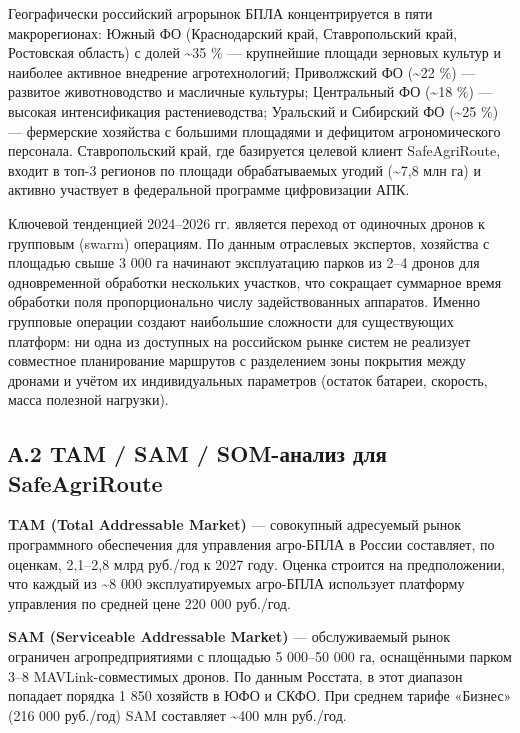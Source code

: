 \documentclass[14pt,a4paper]{extarticle}
\begin{document}
Географически российский агрорынок БПЛА концентрируется в пяти макрорегионах: Южный ФО (Краснодарский край, Ставропольский край, Ростовская область) с долей \textasciitilde35 \% --- крупнейшие площади зерновых культур и наиболее активное внедрение агротехнологий; Приволжский ФО (\textasciitilde22 \%) --- развитое животноводство и масличные культуры; Центральный ФО (\textasciitilde18 \%) --- высокая интенсификация растениеводства; Уральский и Сибирский ФО (\textasciitilde25 \%) --- фермерские хозяйства с большими площадями и дефицитом агрономического персонала. Ставропольский край, где базируется целевой клиент SafeAgriRoute, входит в топ-3 регионов по площади обрабатываемых угодий (\textasciitilde7,8 млн га) и активно участвует в федеральной программе цифровизации АПК.

Ключевой тенденцией 2024--2026 гг. является переход от одиночных дронов к групповым (swarm) операциям. По данным отраслевых экспертов, хозяйства с площадью свыше 3 000 га начинают эксплуатацию парков из 2--4 дронов для одновременной обработки нескольких участков, что сокращает суммарное время обработки поля пропорционально числу задействованных аппаратов. Именно групповые операции создают наибольшие сложности для существующих платформ: ни одна из доступных на российском рынке систем не реализует совместное планирование маршрутов с разделением зоны покрытия между дронами и учётом их индивидуальных параметров (остаток батареи, скорость, масса полезной нагрузки).

\hypertarget{ux430.2-tam-sam-som-ux430ux43dux430ux43bux438ux437-ux434ux43bux44f-safeagriroute}{%
\subsection{А.2 TAM / SAM / SOM-анализ для SafeAgriRoute}\label{ux430.2-tam-sam-som-ux430ux43dux430ux43bux438ux437-ux434ux43bux44f-safeagriroute}}

\textbf{TAM (Total Addressable Market)} --- совокупный адресуемый рынок программного обеспечения для управления агро-БПЛА в России составляет, по оценкам, 2,1--2,8 млрд руб./год к 2027 году. Оценка строится на предположении, что каждый из \textasciitilde8 000 эксплуатируемых агро-БПЛА использует платформу управления по средней цене 220 000 руб./год.

\textbf{SAM (Serviceable Addressable Market)} --- обслуживаемый рынок ограничен агропредприятиями с площадью 5 000--50 000 га, оснащёнными парком 3--8 MAVLink-совместимых дронов. По данным Росстата, в этот диапазон попадает порядка 1 850 хозяйств в ЮФО и СКФО. При среднем тарифе «Бизнес» (216 000 руб./год) SAM составляет \textasciitilde400 млн руб./год.
\end{document}
